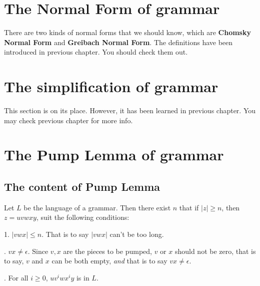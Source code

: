 \section{The Normal Form of grammar}
\label{sec:The Normal Form of grammar}

There are two kinds of normal forms that we should know, which are \textbf{Chomsky Normal Form} and \textbf{Greibach Normal Form}. 
The definitions have been introduced in previous chapter. You should check them out.

\section{The simplification of grammar}
\label{sec:The simplification of grammar}

This section is on its place. However, it has been learned in previous chapter. You may 
check previous chapter for more info.
\section{The Pump Lemma of grammar}
\label{sec:The Pump Lemma of grammar}

\subsection{The content of Pump Lemma}
\begin{thm}
\label{Pump Lemma}
Let \(L \) be the language of a grammar. Then there exist \(n\) that if \(|z| \ge n\), then \(z = uvwxy\), suit the following 
conditions: 

	\bigskip
	\setlength{\hangindent}{33pt}
	1. \(| v w x | \le n\). That is to say \( |v  w x |  \) can't be too long.

	. \(v x \ne\epsilon\). Since \(v,  x \) are the pieces to be pumped, \(v\) or \(x\) should not be zero, that is to 
	say, \(v\) and \(x\) can be both empty, \emph{and} that is to say \( v x \ne\epsilon\).

	. For all \(i \ge 0\), \(u v ^{i} w x ^{i} y\) is in \(L\).
\end{thm}

